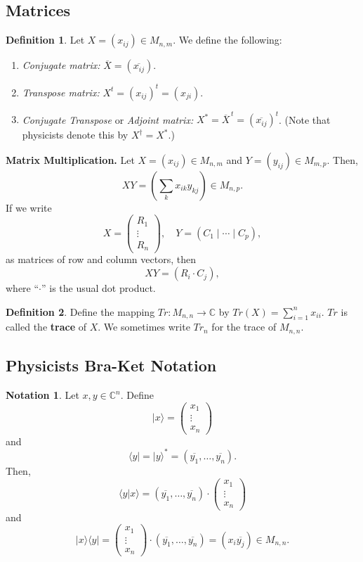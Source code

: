 \documentclass[12pt]{article}
\theoremstyle{definition}
\newtheorem*{definition}{Definition}
\newtheorem*{notation}{Notation}
\newcommand{\ket}[1]{|#1\rangle}
\newcommand{\bra}[1]{\langle #1|}
\newcommand{\braket}[2]{\langle #1|#2\rangle}
\newcommand{\ketbra}[2]{|#1\rangle\langle #2|}
\newcommand{\C}{\mathbb{C}}
\begin{document}
\subsection{Matrices}

\begin{definition}
Let $X = (x_{ij}) \in M_{n,m}$. We define the following:
\begin{enumerate}
\item \textit{Conjugate matrix:} $\overline{X} = (\overline{x_{ij}})$.
\item \textit{Transpose matrix:} $X^t = (x_{ij})^t = (x_{ji})$.
\item \textit{Conjugate Transpose} or \textit{Adjoint matrix:} $X^* = \overline{X}^{\,t} = (\overline{x_{ij}})^t$. (Note that physicists denote this by $X^\dagger = X^*$.)
\end{enumerate}
\end{definition}

\textbf{Matrix Multiplication.} Let $X = (x_{ij}) \in M_{n,m}$ and $Y = (y_{ij}) \in M_{m,p}$. Then,
\[
XY = \left(\sum_k x_{ik} y_{kj}\right) \in M_{n,p}.
\]
If we write
\[
X = \begin{pmatrix} R_1 \\ \vdots \\ R_n \end{pmatrix},\quad Y = (C_1 \mid \cdots \mid C_p),
\]
as matrices of row and column vectors, then
\[
XY = (R_i \cdot C_j),
\]
where ``$\cdot$'' is the usual dot product.

\begin{definition}
Define the mapping $Tr : M_{n,n} \to \C$ by $Tr(X) = \sum_{i=1}^n x_{ii}$. $Tr$ is called the \textbf{trace} of $X$. We sometimes write $Tr_n$ for the trace of $M_{n,n}$.
\end{definition}

\subsection{Physicists Bra-Ket Notation}

\begin{notation}
Let $x, y \in \C^n$. Define
\[
\ket{x} = \begin{pmatrix} x_1 \\ \vdots \\ x_n \end{pmatrix}
\]
and
\[
\bra{y} = \ket{y}^* = (\overline{y_1},\ldots,\overline{y_n}).
\]
Then,
\[
\braket{y}{x} = (\overline{y_1},\ldots,\overline{y_n}) \cdot \begin{pmatrix} x_1 \\ \vdots \\ x_n \end{pmatrix}
\]
and
\[
\ketbra{x}{y} = \begin{pmatrix} x_1 \\ \vdots \\ x_n \end{pmatrix} \cdot (\overline{y_1},\ldots,\overline{y_n}) = (x_i \overline{y_j}) \in M_{n,n}.
\]
\end{notation}
\end{document}
